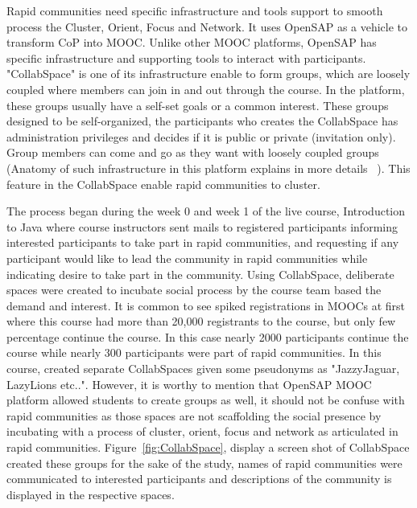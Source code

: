 \documentclass[manuscript,screen,review]{acmart}
\begin{document}
Rapid communities need specific infrastructure and tools support to smooth process the Cluster, Orient, Focus and Network. It uses OpenSAP as a vehicle to transform CoP into MOOC. Unlike other MOOC platforms, OpenSAP has specific infrastructure and supporting tools to interact with participants. "CollabSpace" is one of its infrastructure enable to form groups, which are loosely coupled where members can join in and out through the course. In the platform, these groups usually have a self-set goals or a common interest. These groups designed to be self-organized, the participants who creates the CollabSpace has administration privileges and decides if it is public or private (invitation only). Group members can come and go as they want with loosely coupled groups (Anatomy of such infrastructure in this platform explains in more details  ~\cite{staubitz2014supporting,staubitz2017collaboration}). This feature in the CollabSpace enable rapid communities to cluster. 

The process began during the week 0 and week 1 of the live course, Introduction to Java where course instructors sent mails to registered participants informing interested participants to take part in rapid communities, and requesting if any participant would like to lead the community in rapid communities while indicating desire to take part in the community. Using CollabSpace, deliberate spaces were created to incubate social process by the course team based the demand and interest. It is common to see spiked registrations in MOOCs at first where this course had more than 20,000 registrants to the course, but only few percentage continue the course. In this case nearly 2000 participants continue the course while nearly 300 participants were part of rapid communities. In this course, created separate CollabSpaces given some pseudonyms as "JazzyJaguar, LazyLions etc..". However, it is worthy to mention that OpenSAP MOOC platform allowed students to create groups as well, it should not be confuse with rapid communities as those spaces are not scaffolding the social presence by incubating with a process of cluster, orient, focus and network as articulated in rapid communities. Figure~\ref{fig:CollabSpace}, display a screen shot of CollabSpace created these groups for the sake of the study, names of rapid communities were communicated to interested participants and descriptions of the community is displayed in the respective spaces.  
\end{document}
